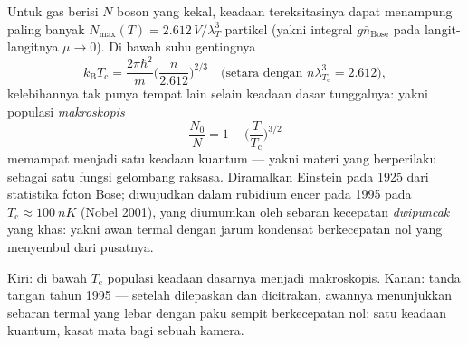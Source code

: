 \begin{theorem}\label{thm:b3:quantum-statistics:bec}
Untuk gas berisi $N$ boson yang kekal, keadaan tereksitasinya dapat
menampung paling banyak $N_{\max}(T) = 2.612\,V/\lambda_T^3$ partikel
(yakni integral $g\bar n_{\text{Bose}}$ pada langit-langitnya $\mu \to 0$). Di bawah
suhu gentingnya
\[
k_{\text{B}}T_{\text{c}} = \frac{2\pi\hbar^2}{m}
\Big(\frac{n}{2.612}\Big)^{2/3}
\quad\text{(setara dengan } n\lambda_{T_{\text{c}}}^3 = 2.612
\text{)} ,
\]
kelebihannya tak punya tempat lain selain keadaan dasar tunggalnya:
yakni populasi \emph{makroskopis}
\[
\frac{N_0}{N} = 1 - \Big(\frac{T}{T_{\text{c}}}\Big)^{3/2}
\]
memampat menjadi satu keadaan kuantum --- yakni materi yang berperilaku
sebagai satu fungsi gelombang raksasa. Diramalkan Einstein pada 1925 dari
statistika foton Bose; diwujudkan dalam rubidium encer pada 1995 pada
$T_{\text{c}} \approx \qty{100}{nK}$ (Nobel 2001), yang diumumkan oleh
sebaran kecepatan \emph{dwipuncak} yang khas: yakni awan termal
dengan jarum kondensat berkecepatan nol yang menyembul dari pusatnya.
\end{theorem}
\admitted

\begin{omfigure}

{\small Kiri: di bawah $T_{\text{c}}$ populasi keadaan dasarnya
menjadi makroskopis. Kanan: tanda tangan tahun 1995 --- setelah
dilepaskan dan dicitrakan, awannya menunjukkan sebaran termal yang lebar
dengan paku sempit berkecepatan nol: satu keadaan kuantum, kasat mata
bagi sebuah kamera.}
\end{omfigure}

